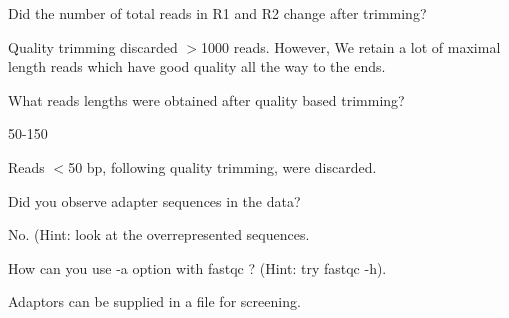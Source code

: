 \begin{questions}
%
%

Did the number of total reads in R1 and R2 change after trimming?
\begin{answer}
Quality trimming discarded $>$1000 reads. However, We retain a lot of maximal
length reads which have good quality all the way to the ends.
\end{answer}

What reads lengths were obtained after quality based trimming?
\begin{answer}
50-150

Reads $<$50 bp, following quality trimming, were discarded.
\end{answer}

Did you observe adapter sequences in the data?
\begin{answer}
No. (Hint: look at the overrepresented sequences.
\end{answer}

How can you use -a option with fastqc ? (Hint: try fastqc -h).
\begin{answer}
Adaptors can be supplied in a file for screening.
\end{answer}
\end{questions}

